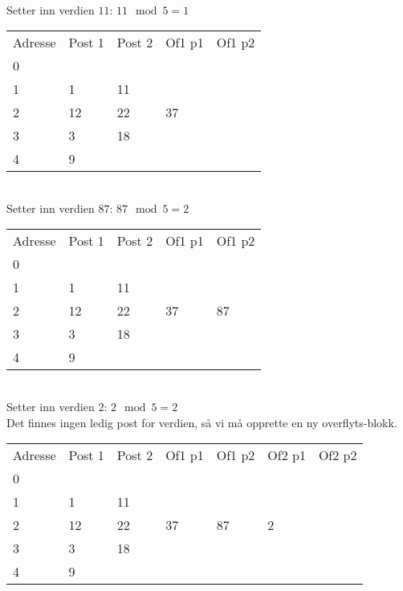 ~\\
Setter inn verdien $11$: $11 \mod 5 = 1$\\
\begin{tabular}{|l|l|l|l|l|}
    \hline
    Adresse & Post 1 & Post 2 & Of1 p1 & Of1 p2 \\
    0       & ~      & ~      &\cellcolor{gray}&\cellcolor{gray}\\
    1       & 1      & 11     &\cellcolor{gray}&\cellcolor{gray}\\
    2       & 12     & 22     & 37     & ~      \\
    3       & 3      & 18     &\cellcolor{gray}&\cellcolor{gray}\\
    4       & 9      & ~      &\cellcolor{gray}&\cellcolor{gray}\\ \hline
\end{tabular}

~\\
Setter inn verdien $87$: $87 \mod 5 = 2$\\
\begin{tabular}{|l|l|l|l|l|}
    \hline
    Adresse & Post 1 & Post 2 & Of1 p1 & Of1 p2 \\
    0       & ~      & ~      &\cellcolor{gray}&\cellcolor{gray}\\
    1       & 1      & 11     &\cellcolor{gray}&\cellcolor{gray}\\
    2       & 12     & 22     & 37     & 87     \\
    3       & 3      & 18     &\cellcolor{gray}&\cellcolor{gray}\\
    4       & 9      & ~      &\cellcolor{gray}&\cellcolor{gray}\\ \hline
\end{tabular}

~\\
Setter inn verdien $2$: $2 \mod 5 = 2$\\
Det finnes ingen ledig post for verdien, så vi må opprette en ny overflyts-blokk.\\
\begin{tabular}{|l|l|l|l|l|l|l|}
    \hline
    Adresse & Post 1 & Post 2 & Of1 p1 & Of1 p2 & Of2 p1 & Of2 p2 \\
    0       & ~      & ~      &\cellcolor{gray}&\cellcolor{gray}&\cellcolor{gray}&\cellcolor{gray}\\
    1       & 1      & 11     &\cellcolor{gray}&\cellcolor{gray}&\cellcolor{gray}&\cellcolor{gray}\\
    2       & 12     & 22     & 37     & 87     & 2      & ~      \\
    3       & 3      & 18     &\cellcolor{gray}&\cellcolor{gray}&\cellcolor{gray}&\cellcolor{gray}\\
    4       & 9      & ~      &\cellcolor{gray}&\cellcolor{gray}&\cellcolor{gray}&\cellcolor{gray}\\ \hline
\end{tabular}

